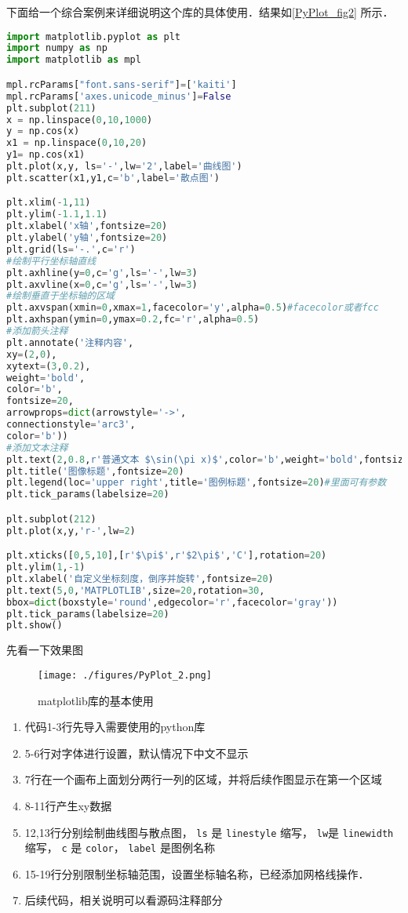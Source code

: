 下面给一个综合案例来详细说明这个库的具体使用．结果如\autoref{PyPlot_fig2} 所示．
\begin{lstlisting}[language=python]
import matplotlib.pyplot as plt
import numpy as np
import matplotlib as mpl

mpl.rcParams["font.sans-serif"]=['kaiti']
mpl.rcParams['axes.unicode_minus']=False
plt.subplot(211)
x = np.linspace(0,10,1000)
y = np.cos(x)
x1 = np.linspace(0,10,20)
y1= np.cos(x1)
plt.plot(x,y, ls='-',lw='2',label='曲线图')
plt.scatter(x1,y1,c='b',label='散点图')

plt.xlim(-1,11)
plt.ylim(-1.1,1.1)
plt.xlabel('x轴',fontsize=20)
plt.ylabel('y轴',fontsize=20)
plt.grid(ls='-.',c='r')
#绘制平行坐标轴直线
plt.axhline(y=0,c='g',ls='-',lw=3)
plt.axvline(x=0,c='g',ls='-',lw=3)
#绘制垂直于坐标轴的区域
plt.axvspan(xmin=0,xmax=1,facecolor='y',alpha=0.5)#facecolor或者fcc
plt.axhspan(ymin=0,ymax=0.2,fc='r',alpha=0.5)
#添加箭头注释
plt.annotate('注释内容',
xy=(2,0),
xytext=(3,0.2),
weight='bold',
color='b',
fontsize=20,
arrowprops=dict(arrowstyle='->',
connectionstyle='arc3',
color='b'))
#添加文本注释
plt.text(2,0.8,r'普通文本 $\sin(\pi x)$',color='b',weight='bold',fontsize=20)
plt.title('图像标题',fontsize=20)
plt.legend(loc='upper right',title='图例标题',fontsize=20)#里面可有参数
plt.tick_params(labelsize=20)

plt.subplot(212)
plt.plot(x,y,'r-',lw=2)

plt.xticks([0,5,10],[r'$\pi$',r'$2\pi$','C'],rotation=20)
plt.ylim(1,-1)
plt.xlabel('自定义坐标刻度，倒序并旋转',fontsize=20)
plt.text(5,0,'MATPLOTLIB',size=20,rotation=30,
bbox=dict(boxstyle='round',edgecolor='r',facecolor='gray'))
plt.tick_params(labelsize=20)
plt.show()
\end{lstlisting}
先看一下效果图

\begin{figure}[ht]
\centering
\texttt{[image: ./figures/PyPlot\_2.png]}
\caption{matplotlib库的基本使用} \label{PyPlot_fig2}
\end{figure}

\begin{enumerate}
\item 代码1-3行先导入需要使用的python库
\item 5-6行对字体进行设置，默认情况下中文不显示
\item 7行在一个画布上面划分两行一列的区域，并将后续作图显示在第一个区域
\item 8-11行产生xy数据
\item 12,13行分别绘制曲线图与散点图， \verb|ls| 是 \verb|linestyle| 缩写， \verb|lw|是 \verb|linewidth| 缩写， \verb|c| 是 \verb|color|， \verb|label| 是图例名称
\item 15-19行分别限制坐标轴范围，设置坐标轴名称，已经添加网格线操作．
\item 后续代码，相关说明可以看源码注释部分
\end{enumerate}

